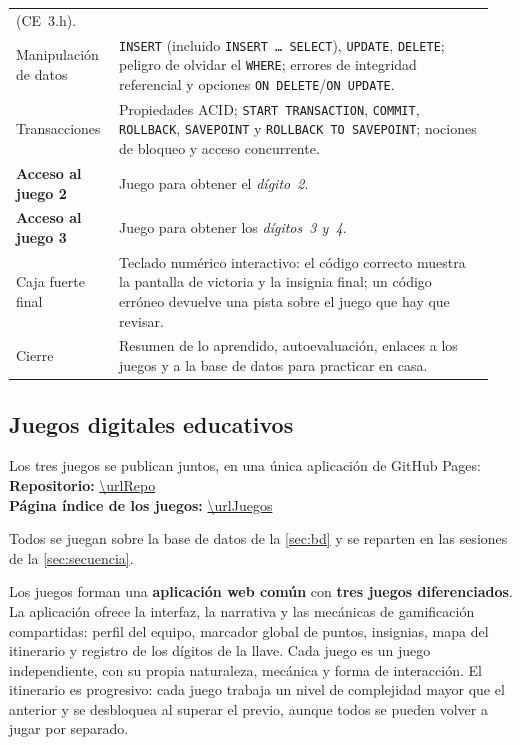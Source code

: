 \documentclass[11pt,a4paper]{article}
\begin{document}
\begin{longtable}{@{}p{0.2\linewidth}p{0.75\linewidth}@{}}
(CE~3.h). \\
\addlinespace
Manipulación de datos & \texttt{INSERT} (incluido \texttt{INSERT \ldots{} SELECT}),
\texttt{UPDATE}, \texttt{DELETE}; peligro de olvidar el \texttt{WHERE}; errores de
integridad referencial y opciones \texttt{ON DELETE}/\texttt{ON UPDATE}. \\
\addlinespace
Transacciones & Propiedades ACID; \texttt{START TRANSACTION}, \texttt{COMMIT},
\texttt{ROLLBACK}, \texttt{SAVEPOINT} y \texttt{ROLLBACK TO SAVEPOINT}; nociones de bloqueo y
acceso concurrente. \\
\addlinespace
\textbf{Acceso al juego 2} & Juego para obtener el \emph{dígito~2}. \\
\addlinespace
\textbf{Acceso al juego 3} & Juego para obtener los \emph{dígitos~3 y~4}. \\
\addlinespace
Caja fuerte final & Teclado numérico interactivo: el código correcto muestra la pantalla
de victoria y la insignia final; un código erróneo devuelve una pista sobre el juego que hay
que revisar. \\
\addlinespace
Cierre & Resumen de lo aprendido, autoevaluación, enlaces a los juegos y a la base de datos
para practicar en casa. \\
\bottomrule
\end{longtable}

\subsection{Juegos digitales educativos}
\label{sec:juegos}

\begin{nota}
Los tres juegos se publican juntos, en una única aplicación de GitHub Pages:\\
\textbf{Repositorio:} \url{\urlRepo}\\
\textbf{Página índice de los juegos:} \url{\urlJuegos}
\end{nota}

Todos se juegan sobre la base de datos de la \autoref{sec:bd} y se reparten en las sesiones de la
\autoref{sec:secuencia}.

Los juegos forman una \textbf{aplicación web común} con \textbf{tres juegos diferenciados}.
La aplicación ofrece la interfaz, la narrativa y las mecánicas de gamificación
compartidas: perfil del equipo, marcador global de puntos, insignias, mapa del itinerario y
registro de los dígitos de la llave. Cada juego es un juego independiente, con su propia
naturaleza, mecánica y forma de interacción. El itinerario es progresivo: cada juego trabaja un nivel de complejidad mayor que el anterior
y se desbloquea al superar el previo, aunque todos se pueden volver a jugar por separado.
\end{document}
